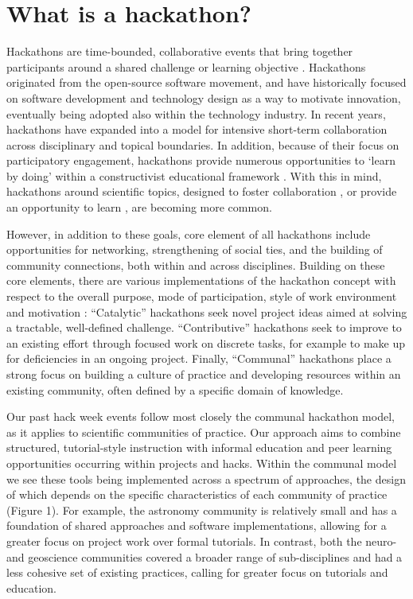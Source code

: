 \section*{What is a hackathon?}

Hackathons are time-bounded, collaborative events that bring together participants around a shared challenge or learning objective \cite{Decker2015}.
Hackathons originated from the open-source software movement, and have historically focused on software development and technology design as a way to motivate innovation, eventually being adopted also within the technology industry.
In recent years, hackathons have expanded into a model for intensive short-term collaboration across disciplinary and topical boundaries.
In addition, because of their focus on participatory engagement, hackathons provide numerous opportunities to `learn by doing' within a constructivist educational framework \cite{Bransford2000-lu,Papert1980-fh}.
With this in mind, hackathons around scientific topics, designed to foster collaboration \cite{Groen2015-cj,Moller2013-ah}, or provide an opportunity to learn \cite{Kienzler2015-zu,Lamers2014-xf}, are becoming more common.

However, in addition to these goals, core element of all hackathons include opportunities for networking, strengthening of social ties, and the building of community connections, both within and across disciplines.
Building on these core elements, there are various implementations of the hackathon concept with respect to the overall purpose, mode of participation, style of work environment and motivation \cite{Drouhard2017}:
``Catalytic'' hackathons seek novel project ideas aimed at solving a tractable, well-defined challenge.
``Contributive'' hackathons seek to improve to an existing effort through focused work on discrete tasks, for example to make up for deficiencies in an ongoing project.
Finally, ``Communal'' hackathons place a strong focus on building a culture of practice and developing resources within an existing community, often defined by a specific domain of knowledge.

Our past hack week events follow most closely the communal hackathon model, as it applies to scientific communities of practice.
Our approach aims to combine structured, tutorial-style instruction with informal education and peer learning opportunities occurring within projects and hacks.
Within the communal model we see these tools being implemented across a spectrum of approaches, the design of which depends on the specific characteristics of each community of practice (Figure 1).
For example, the astronomy community is relatively small and has a foundation of shared approaches and software implementations, allowing for a greater focus on project work over formal tutorials.
In contrast, both the neuro- and geoscience communities covered a broader range of sub-disciplines and had a less cohesive set of existing practices, calling for greater focus on tutorials and education.


